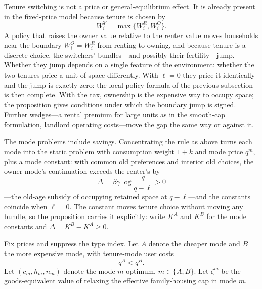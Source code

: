\documentclass[11pt]{article}
\newcommand{\1}{\mathbf 1}
\begin{document}
Tenure switching is not a price or general-equilibrium effect. It is already present in the fixed-price model because tenure is chosen by
\[
W_i^Y=\max\{W_i^R,W_i^O\}.
\]
A policy that raises the owner value relative to the renter value moves households near the boundary $W_i^O=W_i^R$ from renting to owning, and because tenure is a discrete choice, the switchers' bundles---and possibly their fertility---jump. Whether they jump depends on a single feature of the environment: whether the two tenures price a unit of space differently. With $\bar\ell=0$ they price it identically and the jump is exactly zero: the local policy formula of the previous subsection is then complete. With the tax, ownership is the expensive way to occupy space; the proposition gives conditions under which the boundary jump is signed. Further wedges---a rental premium for large units as in the smooth-cap formulation, landlord operating costs---move the gap the same way or against it.

The mode problems include savings. Concentrating the rule as above turns each mode into the static problem with consumption weight $1+k$ and mode price $q^m$, plus a mode constant: with common old preferences and interior old choices, the owner mode's continuation exceeds the renter's by
\[
\Delta=\beta\gamma\log\frac{q}{q-\bar\ell}>0
\]
---the old-age subsidy of occupying retained space at $q-\bar\ell$---and the constants coincide when $\bar\ell=0$. The constant moves tenure choice without moving any bundle, so the proposition carries it explicitly: write $K^A$ and $K^B$ for the mode constants and $\Delta=K^B-K^A\ge0$.

Fix prices and suppress the type index. Let $A$ denote the cheaper mode and $B$ the more expensive mode, with tenure-mode user costs
\[
q^A<q^B.
\]
Let $(c_m,h_m,n_m)$ denote the mode-$m$ optimum, $m\in\{A,B\}$. Let $\zeta^m$ be the goods-equivalent value of relaxing the effective family-housing cap in mode $m$.
\end{document}
